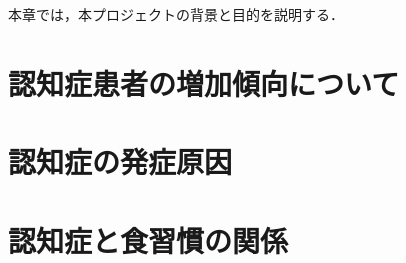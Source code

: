 \documentclass[../report]{subfiles}
\begin{document}
本章では，本プロジェクトの背景と目的を説明する．


\section{認知症患者の増加傾向について}


\section{認知症の発症原因}


\section{認知症と食習慣の関係}
\end{document}
